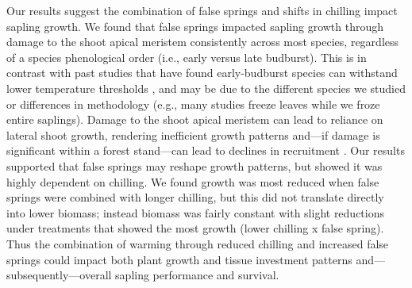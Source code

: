 \documentclass{article}\usepackage[]{graphicx}\usepackage[]{color}
\begin{document}
\begin{enumerate}
Our results suggest the combination of false springs and shifts in chilling impact sapling growth. We found that false springs impacted sapling growth through damage to the shoot apical meristem consistently across most species, regardless of a species phenological order (i.e., early versus late budburst). This is in contrast with past studies that have found early-budburst species can withstand lower temperature thresholds \citep{Lenz2013, Muffler2016}, and may be due to the different species we studied or differences in methodology (e.g., many studies freeze leaves while we froze entire saplings). Damage to the shoot apical meristem can lead to reliance on lateral shoot growth, rendering inefficient growth patterns and---if damage is significant within a forest stand---can lead to declines in recruitment \citep{Rhodes2018}. Our results supported that false springs may reshape growth patterns, but showed it was highly dependent on chilling. We found growth was most reduced when false springs were combined with longer chilling, but this did not translate directly into lower biomass; instead biomass was fairly constant with slight reductions under treatments that showed the most growth (lower chilling x false spring). Thus the combination of warming through reduced chilling and increased false springs could impact both plant growth and tissue investment patterns and---subsequently---overall sapling performance and survival. 
  

\end{enumerate}
\end{document}
